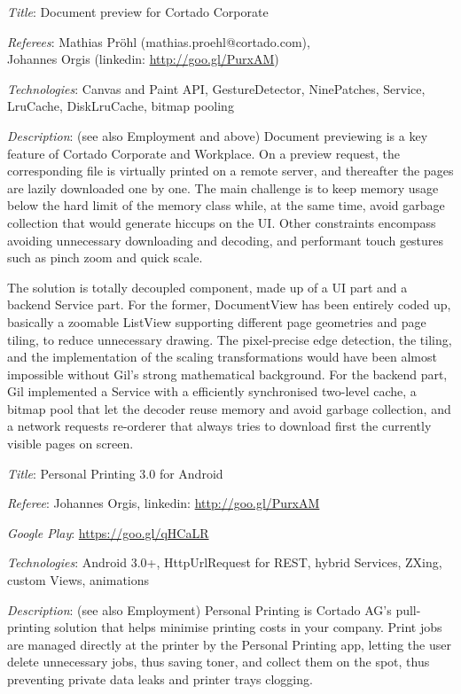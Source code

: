 \documentclass[letterpaper]{article}
\renewenvironment{itemize}{
  \begin{list}{}{
    \setlength{\leftmargin}{1.5em}
  }
}{
  \end{list}
}
\newenvironment{itemize1}{
  \begin{list}{}{
    \setlength{\leftmargin}{0em}
  }
}{
  \end{list}
}
\begin{document}
\begin{itemize1}
\bigskip

\item
\begin{itemize}
\item {\it Title}: Document preview for Cortado Corporate 
\item {\it Referees}: Mathias Pr\"ohl (mathias.proehl@cortado.com),
    \\\phantom{xxxxxxx.}Johannes Orgis (linkedin: \url{http://goo.gl/PurxAM})
\item {\it Technologies}: Canvas and Paint API, GestureDetector, NinePatches, Service, LruCache, DiskLruCache, bitmap pooling
\item {\it Description}: (see also Employment and above) Document previewing is a key feature of Cortado Corporate and Workplace. On a preview request, the corresponding file is virtually printed on a remote server, and thereafter the pages are lazily downloaded one by one. The main challenge is to keep memory usage below the hard limit of the memory class while, at the same time, avoid garbage collection that would generate hiccups on the UI. Other constraints encompass avoiding unnecessary downloading and decoding, and performant touch gestures such as pinch zoom and quick scale.
\medskip

The solution is totally decoupled component, made up of a UI part and a backend Service part. For the former, DocumentView has been entirely coded up, basically a zoomable ListView supporting different page geometries and page tiling, to reduce unnecessary drawing. The pixel-precise edge detection, the tiling, and the implementation of the scaling transformations would have been almost impossible without Gil's strong mathematical background. For the backend part, Gil implemented a Service with a efficiently synchronised two-level cache, a bitmap pool that let the decoder reuse memory and avoid garbage collection, and a network requests re-orderer that always tries to download first the currently visible pages on screen.
\end{itemize}

\bigskip

\item
\begin{itemize}
\item {\it Title}: Personal Printing 3.0 for Android 
\item {\it Referee}: Johannes Orgis, linkedin: \url{http://goo.gl/PurxAM}
\item {\it Google Play}: \url{https://goo.gl/qHCaLR}
\item {\it Technologies}: Android 3.0+, HttpUrlRequest for REST, hybrid Services, ZXing, custom Views, animations
\item {\it Description}: (see also Employment) Personal Printing is Cortado AG's pull-printing solution that helps minimise printing costs in your company. Print jobs are managed directly at the printer by the Personal Printing app, letting the user delete unnecessary jobs, thus saving toner, and collect them on the spot, thus preventing private data leaks and printer trays clogging.
\medskip


\end{itemize}
\end{itemize1}
\end{document}
